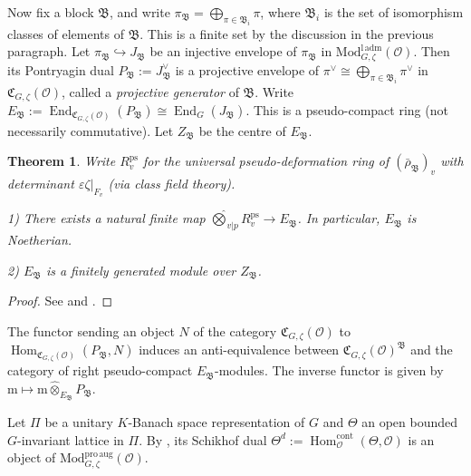 \documentclass[a4paper, 12pt]{amsart}
\newtheorem{thm}{Theorem}[subsection]
\DeclareMathOperator{\Hom}{Hom}
\DeclareMathOperator{\End}{End}
\def\cont{\mathrm{cont}}
\def\ps{\mathrm{ps}}
\def\Ban{\mathrm{Ban}}
\def\adm{\mathrm{adm}}
\newcommand{\cO}{\mathcal{O}}
\newcommand{\kC}{\mathfrak{C}}
\newcommand{\kB}{\mathfrak{B}}
\newcommand{\mm}{\mathrm{m}}
\begin{document}
    Now fix a block $\kB$, and write $\pi_{\kB}=\bigoplus_{\pi\in\kB_i}\pi$, where $\kB_i$ is the set of isomorphism classes of elements of $\kB$. This is a finite set by the discussion in the previous paragraph. Let $\pi_\kB\hookrightarrow J_{\kB}$ be an injective envelope of $\pi_{\kB}$ in $\mathrm{Mod}^{\mathrm{l\, adm}}_{G,\zeta}(\cO)$. Then its Pontryagin dual $P_{\kB}:=J_{\kB}^\vee$ is a projective envelope of $\pi^\vee\cong\bigoplus_{\pi\in\kB_i}\pi^\vee$ in $\kC_{G,\zeta}(\cO)$, called a \textit{projective generator} of $\kB$. Write
    $E_{\kB}:=\End_{\kC_{G,\zeta}(\cO)}(P_{\kB})\cong \End_G(J_{\kB}).$
    This is a pseudo-compact ring (not necessarily commutative). Let $Z_{\kB}$ be the centre of $ E_{\kB}$. 
    
    \begin{thm} \label{Paskunas theory for G}
    	Write $R_v^{\ps}$ for the universal pseudo-deformation ring of $(\bar{\rho}_{\kB})_{v}$ with determinant $\varepsilon\zeta|_{F_v}$ (via class field theory). 
    	
    	1) There exists a natural finite map $\widehat{\bigotimes}_{v|p} R^{\ps}_{v}\to E_{\kB} $. In particular, $E_{\kB} $ is Noetherian.
    	
    	2) $ E_{\kB}$ is a finitely generated module over $Z_{\kB}$.
    \end{thm}
    
    \begin{proof}
    	See \cite[Corollary 3.4.8]{pan2022fontaine} and \cite[Proposition 3.3.2]{Zhang:2024aa}.
    \end{proof}
    
     The functor sending an object $N$ of the category $ \kC_{G,\zeta}(\cO)$ to  $\Hom_{\kC_{G,\zeta}(\cO)}(P_\kB, N)$ induces an anti-equivalence between $ \kC_{G,\zeta}(\cO)^\kB$ and the category of right pseudo-compact $ E_{\kB}$-modules. The inverse functor is given by $\mm \mapsto \mm \widehat{\otimes}_{E_{\kB}} P_{\kB}$.
  
    Let $\Pi$ be a unitary $K$-Banach space representation of $G$ and $\Theta$ an open bounded $G$-invariant lattice in $\Pi$. By \cite[Lemma 4.4]{Pa_k_nas_2013}, its Schikhof dual
    $ \Theta^d:=\Hom_{\cO}^{\cont}(\Theta, \cO)$ is an object of $\mathrm{Mod}_{G, \zeta}^{\mathrm{pro\,aug}}(\cO)$. 
    
    
\end{document}
